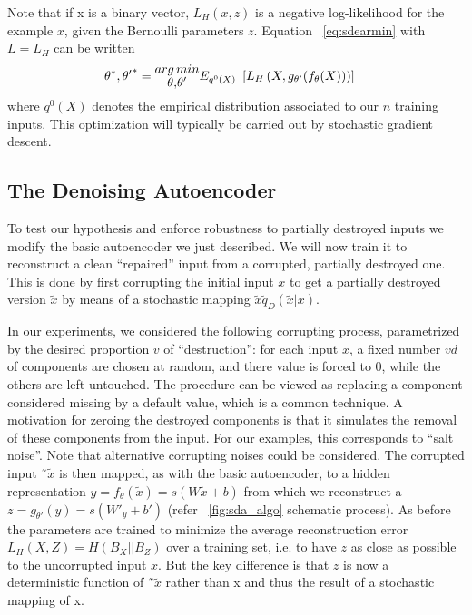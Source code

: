 Note that if x is a binary vector, $L_H(x, z)$ is a negative log-likelihood for the example $x$, given the Bernoulli parameters $z$. Equation ~\ref{eq:sdearmin} with $L = L_H$ can be written 
\begin{equation}\label{eq:sdearmin}
\centering
\begin{aligned}
{\theta}^*, {\theta'}^* &= {\Large\substack{arg\, min \\ {\theta, \theta'}}} E_{q^0(X)}\ \left[L_H\left(X, g_{\theta'}(f_{\theta}(X))\right)\right]
\end{aligned}
\end{equation}
where \(q^0(X)\) denotes the empirical distribution associated to our $n$ training inputs. This optimization will typically be carried out by stochastic gradient descent.
\subsection{The Denoising Autoencoder}
\label{The Denoising Autoencoder}
To test our hypothesis and enforce robustness to partially destroyed inputs we modify the basic autoencoder we just described. We will now train it to reconstruct a clean “repaired” input from a corrupted, partially destroyed one. This is done by first corrupting the initial input $x$ to get a partially destroyed version \(\widetilde{x}\) by means of a stochastic mapping \(\widetilde{x} \tilde q_D(\widetilde{x}|x)\).

In our experiments, we considered the following corrupting process, parametrized by the desired proportion $v$ of “destruction”: for each input $x$, a fixed number $vd$ of components are chosen at random, and there value is forced to 0, while the others are left
untouched. The procedure can be viewed as replacing a component considered missing by a default value, which is a common technique. A motivation for zeroing the destroyed components is that it simulates the removal of these components from the input. For our examples, this corresponds to “salt noise”. Note that alternative corrupting noises could be considered. The corrupted input ˜\(\widetilde{x}\) is then mapped, as with the basic autoencoder, to a hidden representation \(y = f_{\theta}(\widetilde{x}) = s(W\widetilde{x} + b)\) from which we reconstruct a \(z = g_{\theta'}(y) = s({W'}_y + b') \) (refer ~\ref{fig:sda_algo} schematic process). As before the parameters are trained to minimize the average reconstruction error \(L_{H}(X,Z) = H(B_X||B_Z)\) over a training set, i.e. to have $z$ as close as possible to the uncorrupted input $x$. But the key difference is that $z$ is now a deterministic function of ˜\(\widetilde{x}\) rather than x and thus the result of a stochastic mapping of x. 


